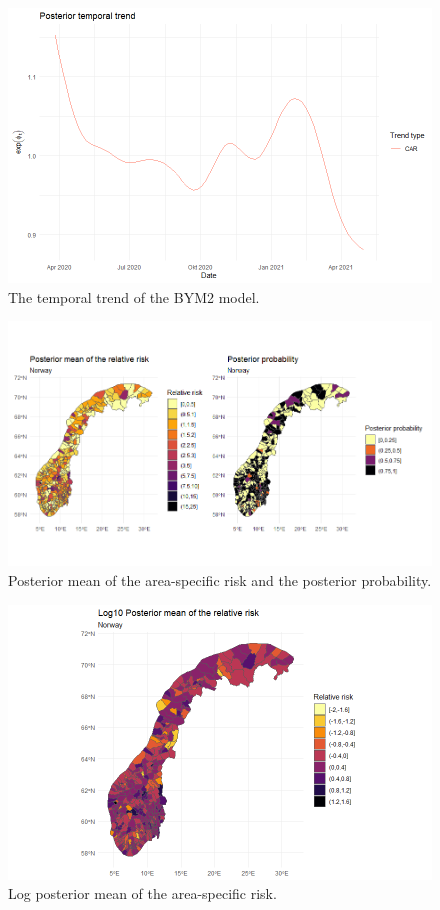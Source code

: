 \begin{figure}[H]
  \centering
  \includegraphics[width = \textwidth]{temporal_trend_norway.png}
  \caption{The temporal trend of the BYM2 model.}
  \label{temporal_trend_norway}
\end{figure}
\begin{figure}[H]
  \centering
  \includegraphics[width = \textwidth]{posterior_norway_temporal.png}
  \caption{Posterior mean of the area-specific risk and the posterior probability.}
  \label{posterior_norway_temporal}
\end{figure}
\begin{figure}[H]
  \centering
  \includegraphics[width = \textwidth]{posterior_norway_temporal_log.png}
  \caption{Log posterior mean of the area-specific risk.}
  \label{posterior_norway_temporal_log}
\end{figure}
\clearpage
